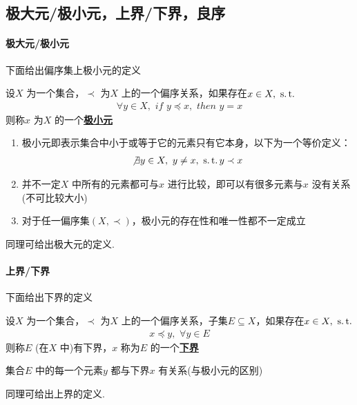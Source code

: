 \subsection{极大元/极小元，上界/下界，良序}
\paragraph{极大元/极小元}
	下面给出偏序集上极小元的定义
	\begin{defn}\label{def 1.3.5}
		设$X$ 为一个集合，$\prec$ 为$X$ 上的一个偏序关系，如果存在$x \in X , \,\, \operatorname{s.t.}$
		\begin{align}
			\forall y \in X , \,\, if \,\, y \preceq x , \,\, then \,\, y = x
		\end{align}
		则称$x$ 为$X$ 的一个\underline{\textbf{极小元}}
		\begin{rmk}
			\begin{enumerate}
				\item 极小元即表示集合中小于或等于它的元素只有它本身，以下为一个等价定义：
				\begin{align}
					\not\exists y \in X , \,\, y \neq x , \,\, \operatorname{s.t.} y \prec x
				\end{align}
			
				\item 并不一定$X$ 中所有的元素都可与$x$ 进行比较，即可以有很多元素与$x$ 没有关系(不可比较大小)
				
				\item 对于任一偏序集$(X , \prec)$，极小元的存在性和唯一性都不一定成立
			\end{enumerate}
		\end{rmk}
	\end{defn}
	同理可给出极大元的定义.
	
\paragraph{上界/下界}
	下面给出下界的定义
	\begin{defn}\label{def 1.3.6}
		设$X$ 为一个集合，$\prec$ 为$X$ 上的一个偏序关系，子集$E \subseteq X$，如果存在$x \in X , \,\, \operatorname{s.t.}$
		\begin{align}
			x \preceq y , \,\, \forall y \in E
		\end{align}
		则称$E$ (在$X$ 中)有下界，$x$ 称为$E$ 的一个\underline{\textbf{下界}}
		\begin{rmk}
			集合$E$ 中的每一个元素$y$ 都与下界$x$ 有关系(与极小元的区别)
		\end{rmk}
	\end{defn}
	同理可给出上界的定义.
	

